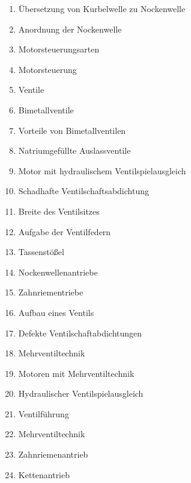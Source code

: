 \begin{enumerate}
\item
  Übersetzung von Kurbelwelle zu Nockenwelle\\
\item
  Anordnung der Nockenwelle\\
\item
  Motorsteuerungsarten\\
\item
  Motorsteuerung\\
\item
  Ventile\\
\item
  Bimetallventile\\
\item
  Vorteile von Bimetallventilen\\
\item
  Natriumgefüllte Auslassventile\\
\item
  Motor mit hydraulischem Ventilspielausgleich\\
\item
  Schadhafte Ventilschaftsabdichtung\\
\item
  Breite des Ventilsitzes\\
\item
  Aufgabe der Ventilfedern\\
\item
  Tassenstößel\\
\item
  Nockenwellenantriebe\\
\item
  Zahnriementriebe\\
\item
  Aufbau eines Ventils\\
\item
  Defekte Ventilschaftabdichtungen\\
\item
  Mehrventiltechnik\\
\item
  Motoren mit Mehrventiltechnik\\
\item
  Hydraulischer Ventilspielausgleich\\
\item
  Ventilführung\\
\item
  Mehrventiltechnik\\
\item
  Zahnriemenantrieb\\
\item
  Kettenantrieb
\end{enumerate}

